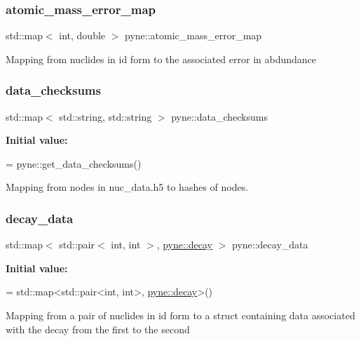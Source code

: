 \subsubsection{\texorpdfstring{atomic\+\_\+mass\+\_\+error\+\_\+map}{atomic\_mass\_error\_map}}
{\footnotesize\ttfamily std\+::map$<$ int, double $>$ pyne\+::atomic\+\_\+mass\+\_\+error\+\_\+map}

Mapping from nuclides in id form to the associated error in abdundance \mbox{\label{namespacepyne_a092bde815498a51a7532e3021a63ede5}} 
\subsubsection{\texorpdfstring{data\+\_\+checksums}{data\_checksums}}
{\footnotesize\ttfamily std\+::map$<$ std\+::string, std\+::string $>$ pyne\+::data\+\_\+checksums}

{\bfseries Initial value\+:}
\begin{DoxyCode}
=
  pyne::get\_data\_checksums()
\end{DoxyCode}


Mapping from nodes in nuc\+\_\+data.\+h5 to hashes of nodes. 

\mbox{\label{namespacepyne_ac880c3701eca3453cb9cdfab30195d65}} 
\subsubsection{\texorpdfstring{decay\+\_\+data}{decay\_data}}
{\footnotesize\ttfamily std\+::map$<$ std\+::pair$<$ int, int $>$, \hyperlink{structpyne_1_1decay}{pyne\+::decay} $>$ pyne\+::decay\+\_\+data}

{\bfseries Initial value\+:}
\begin{DoxyCode}
= 
  std::map<std::pair<int, int>, \hyperlink{structpyne_1_1decay}{pyne::decay}>()
\end{DoxyCode}
Mapping from a pair of nuclides in id form to a struct containing data associated with the decay from the first to the second \mbox{\label{namespacepyne_aa5b6136e3970959756640b867754bb62}} 
